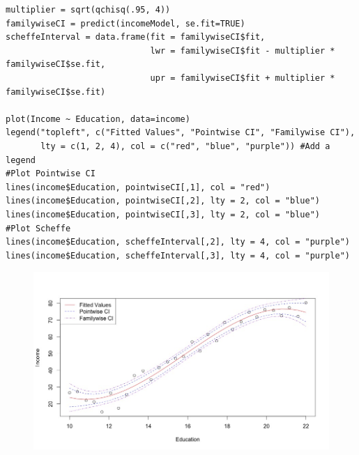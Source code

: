 \documentclass[12pt]{article}
\begin{document}
\begin{enumerate}[(a)]
\begin{lstlisting}
multiplier = sqrt(qchisq(.95, 4))
familywiseCI = predict(incomeModel, se.fit=TRUE)
scheffeInterval = data.frame(fit = familywiseCI$fit,
                             lwr = familywiseCI$fit - multiplier * familywiseCI$se.fit,
                             upr = familywiseCI$fit + multiplier * familywiseCI$se.fit)

plot(Income ~ Education, data=income)
legend("topleft", c("Fitted Values", "Pointwise CI", "Familywise CI"), 
       lty = c(1, 2, 4), col = c("red", "blue", "purple")) #Add a legend
#Plot Pointwise CI
lines(income$Education, pointwiseCI[,1], col = "red")
lines(income$Education, pointwiseCI[,2], lty = 2, col = "blue")
lines(income$Education, pointwiseCI[,3], lty = 2, col = "blue")
#Plot Scheffe
lines(income$Education, scheffeInterval[,2], lty = 4, col = "purple")
lines(income$Education, scheffeInterval[,3], lty = 4, col = "purple")
\end{lstlisting}
\begin{figure}[H] \center
\includegraphics[scale=.6]{Pr2b.jpeg}
\end{figure}


\end{enumerate}
\end{document}
